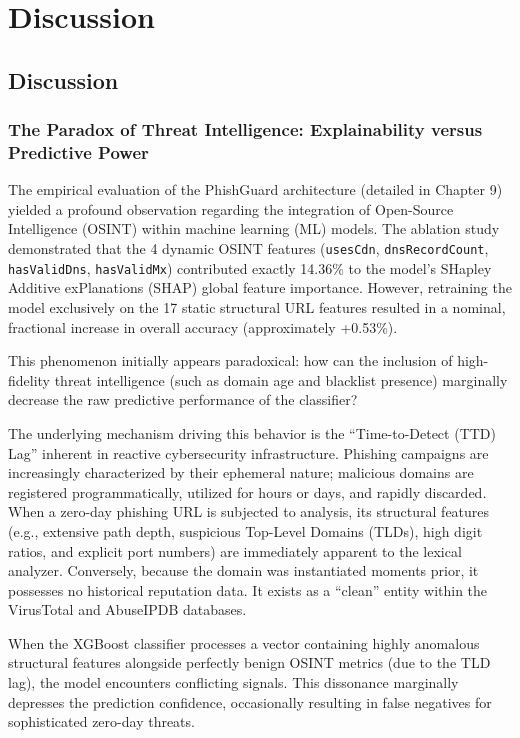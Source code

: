 \chapter{Discussion}
\label{chapter-11-discussion}

\section{Discussion}

\subsection{The Paradox of Threat Intelligence: Explainability versus
Predictive
Power}\label{the-paradox-of-threat-intelligence-explainability-versus-predictive-power}

The empirical evaluation of the PhishGuard architecture (detailed in
Chapter 9) yielded a profound observation regarding the integration of
Open-Source Intelligence (OSINT) within machine learning (ML) models.
The ablation study demonstrated that the 4 dynamic OSINT features
(\texttt{usesCdn}, \texttt{dnsRecordCount}, \texttt{hasValidDns},
\texttt{hasValidMx}) contributed exactly 14.36\% to the model's SHapley
Additive exPlanations (SHAP) global feature importance. However,
retraining the model exclusively on the 17 static structural URL
features resulted in a nominal, fractional increase in overall accuracy
(approximately +0.53\%).

This phenomenon initially appears paradoxical: how can the inclusion of
high-fidelity threat intelligence (such as domain age and blacklist
presence) marginally decrease the raw predictive performance of the
classifier?

The underlying mechanism driving this behavior is the ``Time-to-Detect
(TTD) Lag'' inherent in reactive cybersecurity infrastructure. Phishing
campaigns are increasingly characterized by their ephemeral nature;
malicious domains are registered programmatically, utilized for hours or
days, and rapidly discarded. When a zero-day phishing URL is subjected
to analysis, its structural features (e.g., extensive path depth,
suspicious Top-Level Domains (TLDs), high digit ratios, and explicit
port numbers) are immediately apparent to the lexical analyzer.
Conversely, because the domain was instantiated moments prior, it
possesses no historical reputation data. It exists as a ``clean'' entity
within the VirusTotal and AbuseIPDB databases.

When the XGBoost classifier processes a vector containing highly
anomalous structural features alongside perfectly benign OSINT metrics
(due to the TLD lag), the model encounters conflicting signals. This
dissonance marginally depresses the prediction confidence, occasionally
resulting in false negatives for sophisticated zero-day threats.


